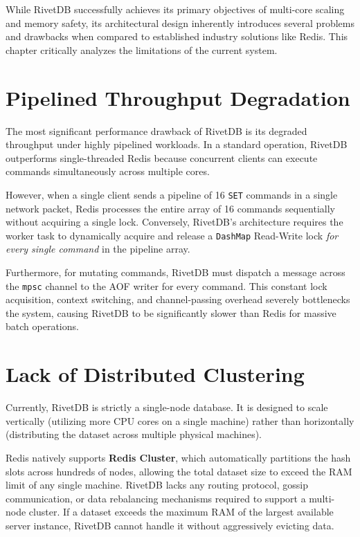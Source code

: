 
While RivetDB successfully achieves its primary objectives of multi-core scaling and memory safety, its architectural design inherently introduces several problems and drawbacks when compared to established industry solutions like Redis. This chapter critically analyzes the limitations of the current system.

\section{Pipelined Throughput Degradation}

The most significant performance drawback of RivetDB is its degraded throughput under highly pipelined workloads. In a standard operation, RivetDB outperforms single-threaded Redis because concurrent clients can execute commands simultaneously across multiple cores. 

However, when a single client sends a pipeline of 16 \texttt{SET} commands in a single network packet, Redis processes the entire array of 16 commands sequentially without acquiring a single lock. Conversely, RivetDB's architecture requires the worker task to dynamically acquire and release a \texttt{DashMap} Read-Write lock \textit{for every single command} in the pipeline array. 

Furthermore, for mutating commands, RivetDB must dispatch a message across the \texttt{mpsc} channel to the AOF writer for every command. This constant lock acquisition, context switching, and channel-passing overhead severely bottlenecks the system, causing RivetDB to be significantly slower than Redis for massive batch operations.

\section{Lack of Distributed Clustering}

Currently, RivetDB is strictly a single-node database. It is designed to scale vertically (utilizing more CPU cores on a single machine) rather than horizontally (distributing the dataset across multiple physical machines).

Redis natively supports \textbf{Redis Cluster}, which automatically partitions the hash slots across hundreds of nodes, allowing the total dataset size to exceed the RAM limit of any single machine. RivetDB lacks any routing protocol, gossip communication, or data rebalancing mechanisms required to support a multi-node cluster. If a dataset exceeds the maximum RAM of the largest available server instance, RivetDB cannot handle it without aggressively evicting data.

